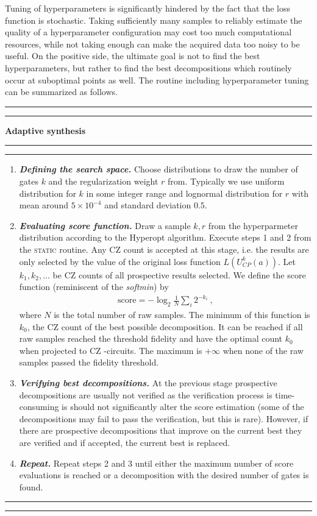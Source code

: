 \documentclass[twocolumn, amsfonts, amssymb, aps, nofootinbib]{revtex4-2}
\newcommand{\CZ}{CZ }
\newcommand{\static}{\textsc{static }}
\begin{document}
Tuning of hyperparameters is significantly hindered by the fact that the loss function is stochastic. Taking sufficiently many samples to reliably estimate the quality of a hyperparameter configuration may cost too much computational resources, while not taking enough can make the acquired data too noisy to be useful. On the positive side, the ultimate goal is not to find the best hyperparameters, but rather to find the best decompositions which routinely occur at suboptimal points as well. The routine including hyperparameter tuning can be summarized as follows.
\\[6pt]
\hrule
\hrule
\vspace{6pt}
{\large\textbf{\qquad Adaptive synthesis}}
\vspace{6pt}
\hrule
\hrule
\begin{enumerate}
\item \textit{\textbf{Defining the search space.}} Choose distributions to draw the number of gates $k$ and the regularization weight $r$ from. Typically we use uniform distribution for $k$ in some integer range and lognormal distribution for $r$ with mean around $5\times 10^{-4}$ and standard deviation $0.5$.
\item \textit{\textbf{Evaluating score function.}} Draw a sample $k, r$ from the hyperparmeter distribution according to the Hyperopt algorithm. Execute steps 1 and 2 from the \static routine. Any \CZ count is accepted at this stage, i.e. the results are only selected by the value of the original loss function $L(U_{CP}^k(a))$. Let $k_1, k_2,\dots$ be \CZ counts of all prospective results selected. We define the score function (reminiscent of the \textit{softmin}) by 
\begin{align}
\text{score}=-\log_2\frac{1}{N}\sum_{i}2^{-k_i} \label{score} \ ,
\end{align}
where $N$ is the total number of raw samples. The minimum of this function is $k_0$, the \CZ count of the best possible decomposition. It can be reached if all raw samples reached the threshold fidelity and have the optimal count $k_0$ when projected to \CZ-circuits. The maximum is $+\infty$ when none of the raw samples passed the fidelity threshold.
\item \textit{\textbf{Verifying best decompositions.}} At the previous stage prospective decompositions are usually not verified as the verification process is time-consuming is should not significantly alter the score estimation (some of the decompositions may fail to pass the verification, but this is rare). However, if there are prospective decompositions that improve on the current best they are verified and if accepted, the current best is replaced.

\item \textit{\textbf{Repeat.}} Repeat steps 2 and 3 until either the maximum number of score evaluations is reached or a decomposition with the desired number of gates is found.
\end{enumerate}
\hrule
\hrule
\vspace{6pt}
\end{document}
